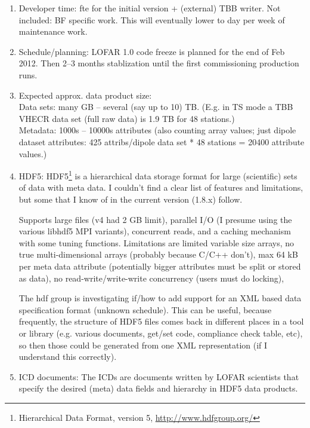 \documentclass[a4paper,11pt]{article}
\begin{document}
\begin{enumerate}[label=\it E.\arabic{*}]
\itemsep0em

\item \label{env:dev_time} Developer time:  fte for the initial version + (external) TBB writer. Not included: BF specific work. This will eventually lower to  day per week of maintenance work.

\item \label{env:sched} Schedule/planning: LOFAR 1.0 code freeze is planned for the end of Feb 2012. Then 2--3 months stablization until the first commissioning production runs.

\item \label{env:data_size} Expected approx. data product size:\\
Data sets: many GB -- several (say up to 10) TB. (E.g. in TS mode a TBB VHECR data set (full raw data) is 1.9 TB for 48 stations.)\\
Metadata: 1000s -- 10000s attributes (also counting array values; just dipole dataset attributes: 425 attribs/dipole data set * 48 stations = 20400 attribute values.)

\item \label{env:HDF5} HDF5: HDF5\footnote{Hierarchical Data Format, version 5, \url{http://www.hdfgroup.org/}} is a hierarchical data storage format for large (scientific) sets of data with meta data.
I couldn't find a clear list of features and limitations, but some that I know of in the current version (1.8.x) follow.

Supports large files (v4 had 2 GB limit), parallel I/O (I presume using the various libhdf5 MPI variants), concurrent reads, and a caching mechanism with some tuning functions.
Limitations are limited variable size arrays, no true multi-dimensional arrays (probably because C/C++ don't), max 64 kB per meta data attribute (potentially bigger attributes must be split or stored as data), no read-write/write-write concurrency (users must do locking), 

The hdf group is investigating if/how to add support for an XML based data specification format (unknown schedule).
This can be useful, because frequently, the structure of HDF5 files comes back in different places in a tool or library (e.g. various documents, get/set code, compliance check table, etc), so then those could be generated from one XML representation (if I understand this correctly).

\item \label{env:ICDs} ICD documents: The ICDs are documents written by LOFAR scientists that specify the desired (meta) data fields and hierarchy in HDF5 data products.


\end{enumerate}
\end{document}

